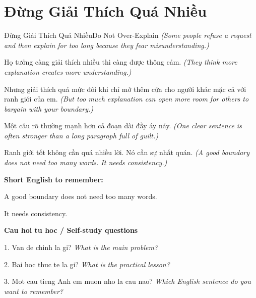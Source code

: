 \section{Đừng Giải Thích Quá Nhiều}
\begin{truyen}{Đừng Giải Thích Quá Nhiều}{Do Not Over-Explain}
\textit{(Some people refuse a request and then explain for too long because they fear misunderstanding.)}

Họ tưởng càng giải thích nhiều thì càng được thông cảm.
\textit{(They think more explanation creates more understanding.)}

Nhưng giải thích quá mức đôi khi chỉ mở thêm cửa cho người khác mặc cả với ranh giới của em.
\textit{(But too much explanation can open more room for others to bargain with your boundary.)}

Một câu rõ thường mạnh hơn cả đoạn dài đầy áy náy.
\textit{(One clear sentence is often stronger than a long paragraph full of guilt.)}

\end{truyen}

\begin{baihoc}
Ranh giới tốt không cần quá nhiều lời. Nó cần sự nhất quán.
\textit{(A good boundary does not need too many words. It needs consistency.)}
\end{baihoc}

\begin{ghinhoanh}
\textbf{Short English to remember:}

A good boundary does not need too many words.

It needs consistency.

\end{ghinhoanh}

\begin{tuhocnhanh}
\textbf{Cau hoi tu hoc / Self-study questions}

1. Van de chinh la gi? \textit{What is the main problem?}

2. Bai hoc thuc te la gi? \textit{What is the practical lesson?}

3. Mot cau tieng Anh em muon nho la cau nao? \textit{Which English sentence do you want to remember?}
\end{tuhocnhanh}
\ngancach

